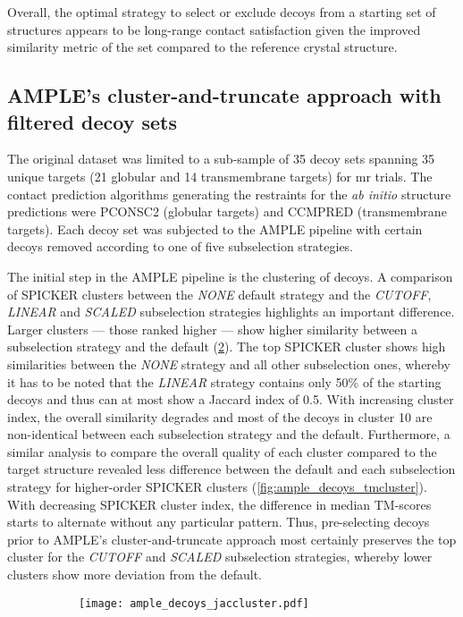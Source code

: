 Overall, the optimal strategy to select or exclude decoys from a starting set of structures appears to be long-range contact satisfaction given the improved similarity metric of the set compared to the reference crystal structure. 


\subsection{AMPLE's cluster-and-truncate approach with filtered decoy sets}
The original dataset was limited to a sub-sample of 35 decoy sets spanning 35 unique targets (21 globular and 14 transmembrane targets) for \gls{mr} trials. The contact prediction algorithms generating the restraints for the \textit{ab initio} structure predictions were PCONSC2 (globular targets) and CCMPRED (transmembrane targets). Each decoy set was subjected to the AMPLE pipeline with certain decoys removed according to one of five subselection strategies.

The initial step in the AMPLE pipeline is the clustering of decoys. A comparison of SPICKER clusters between the \textit{NONE} default strategy and the \textit{CUTOFF}, \textit{LINEAR} and \textit{SCALED} subselection strategies highlights an important difference. Larger clusters --- those ranked higher --- show higher similarity between a subselection strategy and the default (\cref{fig:ample_decoys_jaccluster}). The top SPICKER cluster shows high similarities between the \textit{NONE} strategy and all other subselection ones, whereby it has to be noted that the \textit{LINEAR} strategy contains only 50\% of the starting decoys and thus can at most show a Jaccard index of 0.5. With increasing cluster index, the overall similarity degrades and most of the decoys in cluster 10 are non-identical between each subselection strategy and the default. Furthermore, a similar analysis to compare the overall quality of each cluster compared to the target structure revealed less difference between the default and each subselection strategy for higher-order SPICKER clusters (\cref{fig:ample_decoys_tmcluster}). With decreasing SPICKER cluster index, the difference in median TM-scores starts to alternate without any particular pattern. Thus, pre-selecting decoys prior to AMPLE's cluster-and-truncate approach most certainly preserves the top cluster for the \textit{CUTOFF} and \textit{SCALED} subselection strategies, whereby lower clusters show more deviation from the default.

\begin{figure}[H]
    \centering
    \begin{subfigure}[b]{\textwidth}
        \texttt{[image: ample\_decoys\_jaccluster.pdf]}
        \caption{}
        \label{fig:ample_decoys_jaccluster}
    \end{subfigure}
\end{figure}

